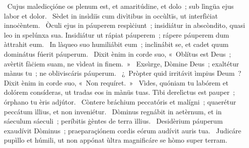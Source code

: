~Cujus maledicçióne os plenum est, et amaritúdine, et dolo~; sub lìngüa ejus labor et dolor. 
~Sèdet in insìdiïs cum divìtibus in occùltïs, ut interfìċiat innoċèntem. 
~Òculi ejus in páuperem respìċiunt~; insidiátur in abscòndito, quasi leo in spelúnxa sua. Insidiátur ut rápiat páuperem~; rápere páuperem dum àttrahit eum. 
~In làqueo suo humiliábit eum~; inclinábit se, et cadet quum dominátus fúerit páuperum. 
~Dixit ènim in corde suo, «~Oblítus est Deus~; avèrtit fàċiem suam, ne vìdeat in finem.~» 
~Exsùrge, Dòmine Deus~; exaltétur mànus tu~; ne obliviscáris páuperum. 
~¿~Pròpter quid irritávit ìmpius Deum~? Dixit ènim in corde suo, «~Non requíret.~» 
~Vìdes, quóniam tu labórem et dolórem consíderas, ut tradas eos in mànüs tuas. Tìbi derelìctus est pauper~; órphano tu èris adjútor. 
~Còntere bráchium peccatóris et malígni~; quaerétur peccátum ìllius, et non inveniétur. 
~Dòminus regnábit in aetèrnum, et in sáeculum sáeculi~; períbitis ġèntes de terra ìllius. 
~Desidèrium páuperum exaudívit Dòminus~; praeparaçiónem cordis eórum audívit auris tua. 
~Judicáre pupìllo et húmili, ut non appónat ùltra magnificáre se hòmo super terram. 
